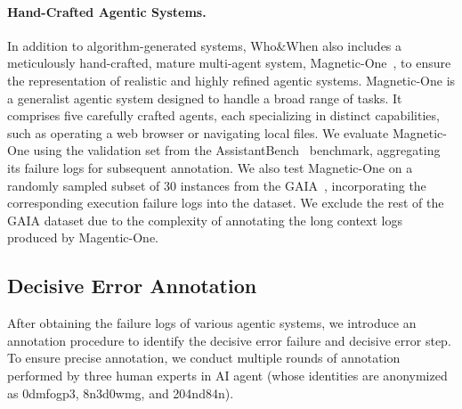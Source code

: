 \paragraph{Hand-Crafted Agentic Systems.}
In addition to algorithm-generated systems, Who\&When also includes a meticulously hand-crafted, mature multi-agent system, Magnetic-One~\citep{fourney2024magentic}, to ensure the representation of realistic and highly refined agentic systems. 
Magnetic-One is a generalist agentic system designed to handle a broad range of tasks. It comprises five carefully crafted agents, each specializing in distinct capabilities, such as operating a web browser or navigating local files. We evaluate Magnetic-One using the validation set from the AssistantBench~\citep{yoran2024assistantbench} benchmark, aggregating its failure logs for subsequent annotation.
We also test Magnetic-One on a randomly sampled subset of 30 instances from the GAIA~\citep{mialon2023gaia}, incorporating the corresponding execution failure logs into the dataset. We exclude the rest of the GAIA dataset due to the complexity of annotating the long context logs produced by Magentic-One. 

\subsection{Decisive Error Annotation}
After obtaining the failure logs of various agentic systems, we introduce an annotation procedure to identify the decisive error failure and decisive error step.
To ensure precise annotation, we conduct multiple rounds of annotation performed by three human experts in AI agent (whose identities are anonymized as 0dmfogp3, 8n3d0wmg, and 204nd84n).

